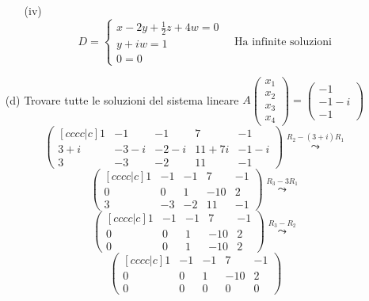 \documentclass[a4paper]{article}
\theoremstyle{break}
\theoremstyle{break}
\theoremstyle{break}
\theoremstyle{break}
\begin{document}
\begin{enumerate}
\begin{enumerate}
		      \item[(iv)]
		            \[
			            D = \begin{cases}
				            x -2y + \frac{1}{2}z + 4w = 0 \\
				            y + iw = 1                    \\
				            0 = 0
			            \end{cases}
			            \quad
			            \text{Ha infinite soluzioni}
		            \]
	      \end{enumerate}
	\item[(d)] Trovare tutte le soluzioni del sistema lineare \( A \begin{pmatrix}
		      x_1 \\
		      x_2 \\
		      x_3 \\
		      x_4
	      \end{pmatrix} = \begin{pmatrix}
		      -1    \\
		      -1 -i \\
		      -1
	      \end{pmatrix}   \)
	      \[
		      \begin{pmatrix} [cccc|c]
			      1     & -1    & -1   & 7       & -1   \\
			      3 + i & -3 -i & -2-i & 11 + 7i & -1-i \\
			      3     & -3    & -2   & 11      & -1
		      \end{pmatrix}
		      \stackrel{R_2 - (3+i)R_1}{\leadsto}
	      \]
	      \[
		      \begin{pmatrix} [cccc|c]
			      1 & -1 & -1 & 7   & -1 \\
			      0 & 0  & 1  & -10 & 2  \\
			      3 & -3 & -2 & 11  & -1
		      \end{pmatrix}
		      \stackrel{R_3 - 3R_1}{\leadsto}
	      \]
	      \[
		      \begin{pmatrix} [cccc|c]
			      1 & -1 & -1 & 7   & -1 \\
			      0 & 0  & 1  & -10 & 2  \\
			      0 & 0  & 1  & -10 & 2
		      \end{pmatrix}
		      \stackrel{R_3 - R_2}{\leadsto}
	      \]
	      \[
		      \begin{pmatrix} [cccc|c]
			      1 & -1 & -1 & 7   & -1 \\
			      0 & 0  & 1  & -10 & 2  \\
			      0 & 0  & 0  & 0   & 0
		      \end{pmatrix}
	      \]


\end{enumerate}
\end{document}
